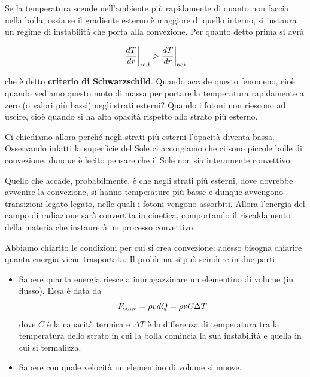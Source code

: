 



Se la temperatura scende nell'ambiente più rapidamente di quanto non faccia nella bolla, ossia se il gradiente esterno è maggiore di quello interno, si instaura un regime di instabilità che porta alla convezione. Per quanto detto prima si avrà

$$\frac{dT}{dr}\bigg|_{\rm rad} > \frac{dT}{dr}\bigg|_{\rm adi}$$

che è detto \textbf{criterio di Schwarzschild}. Quando accade questo fenomeno, cioè quando vediamo questo moto di massa per portare la temperatura rapidamente a zero (o valori più bassi) negli strati esterni? Quando i fotoni non riescono ad uscire, cioè quando si ha alta opacità rispetto allo strato più esterno.

Ci chiediamo allora perché negli strati più esterni l'opacità diventa bassa. Osservando infatti la superficie del Sole ci accorgiamo che ci sono piccole bolle di convezione, dunque è lecito pensare che il Sole non sia interamente convettivo.

Quello che accade, probabilmente, è che negli strati più esterni, dove dovrebbe avvenire la convezione, si hanno temperature più basse e dunque avvengono transizioni legato-legato, nelle quali i fotoni vengono assorbiti. Allora l'energia del campo di radiazione sarà convertita in cinetica, comportando il riscaldamento della materia che instaurerà un processo convettivo.

Abbiamo chiarito le condizioni per cui si crea convezione: adesso bisogna chiarire quanta energia viene trasportata. Il problema si può scindere in due parti:

\begin{itemize}
    \item Sapere quanta energia riesce a immagazzinare un elementino di volume (in flusso). Essa è data da
    $$F_{\rm conv}=\rho v dQ=\rho vC\Delta T$$
    dove $C$ è la capacità termica e $\Delta T$ è la differenza di temperatura tra la temperatura dello strato in cui la bolla comincia la sua instabilità e quella in cui si termalizza.
    \item Sapere con quale velocità un elementino di volume si muove.
\end{itemize}

